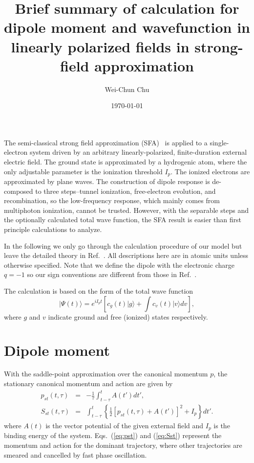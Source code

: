 \documentclass[aps,prl,twocolumn,nofootinbib,letterpaper]{revtex4}
\begin{document}
\title{Brief summary of calculation for dipole moment and wavefunction in linearly polarized fields in strong-field approximation}
\author{Wei-Chun Chu}
\date{\today}

\maketitle

The semi-classical strong field approximation (SFA)~\cite{lewenstein} is applied to a single-electron system driven by an arbitrary linearly-polarized, finite-duration external electric field. The ground state is approximated by a hydrogenic atom, where the only adjustable parameter is the ionization threshold $I_p$. The ionized electrons are approximated by plane waves. The construction of dipole response is de-composed to three steps--tunnel ionization, free-electron evolution, and recombination, so the low-frequency response, which mainly comes from multiphoton ionization, cannot be trusted. However, with the separable steps and the optionally calculated total wave function, the SFA result is easier than first principle calculations to analyze.

In the following we only go through the calculation procedure of our model but leave the detailed theory in Ref.~\cite{lewenstein}. All descriptions here are in atomic units unless otherwise specified. Note that we define the dipole with the electronic charge $q=-1$ so our sign conventions are different from those in Ref.~\cite{lewenstein}.

The calculation is based on the form of the total wave function
\begin{equation}
| \Psi(t) \rangle = e^{iI_p t} \left[ c_g(t) | g \rangle + \int{c_v(t) | v \rangle dv} \right], \label{eq:wavefunc}
\end{equation}
where $g$ and $v$ indicate ground and free (ionized) states respectively.

\section{Dipole moment}

With the saddle-point approximation over the canonical momentum $p$, the stationary canonical momentum and action are given by
\begin{eqnarray}
p_{st}(t,\tau) &=& -\frac{1}{\tau} \int_{t-\tau}^{t} {A(t')dt'}, \label{eq:pst} \\
S_{st}(t,\tau) &=& \int_{t-\tau}^{t} { \left\{ \frac{1}{2} \left[ p_{st}(t,\tau)+A(t') \right]^2 + I_p \right\} dt'}. \label{eq:Sst}
\end{eqnarray}
where $A(t)$ is the vector potential of the given external field and $I_p$ is the binding energy of the system. Eqs.~(\ref{eq:pst}) and (\ref{eq:Sst}) represent the momentum and action for the dominant trajectory, where other trajectories are smeared and cancelled by fast phase oscillation.
\end{document}
